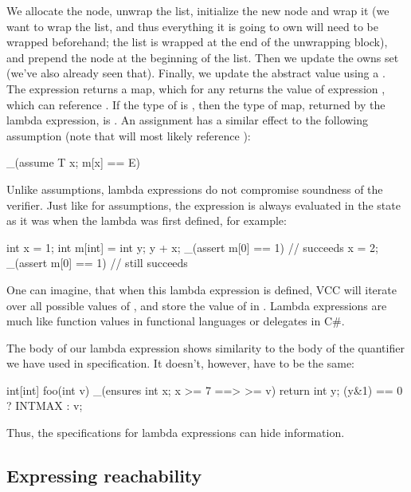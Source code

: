 \noindent
We allocate the node, unwrap the list, initialize the new node
and wrap it (we want to wrap the list, and thus everything it is going to own will
need to be wrapped beforehand; the list is wrapped at the end of the 
unwrapping block), and
prepend the node at the beginning of the list.
Then we update the owns set (we've also already seen that).
Finally, we update the abstract value using a .
The expression  returns a map, which for
any  returns the value of expression ,
which can reference .
If the type of  is , then the type of map, returned by the
lambda expression, is .
An assignment  has a similar effect to
the following assumption (note that  will most likely reference ):
\begin{VCC}
_(assume \forall T x; m[x] == E)
\end{VCC}
\noindent
Unlike assumptions, lambda expressions do not compromise 
soundness of the verifier.
Just like for assumptions,
the expression is always evaluated in the state as it was
when the lambda was first defined, for example:
\begin{VCC}
int x = 1;
int m[int] = \lambda int y; y + x;
_(assert m[0] == 1) // succeeds
x = 2;
_(assert m[0] == 1) // still succeeds
\end{VCC}
One can imagine, that when this lambda expression is defined,
VCC will iterate over all possible values of ,
and store the value of  in .
Lambda expressions are much like function values in functional
languages or delegates in C\#.

\begin{note}
The body of our lambda expression shows similarity to the body
of the quantifier we have used in specification.
It doesn't, however, have to be the same:
\begin{VCC}
int[int] foo(int v)
  _(ensures \forall int x; x >= 7 ==> \result[x] >= v)
{
  return \lambda int y; (y&1) == 0 ? INTMAX : v;
}
\end{VCC}
Thus, the specifications for lambda expressions can hide information.
\end{note}


\subsection{Expressing reachability}

